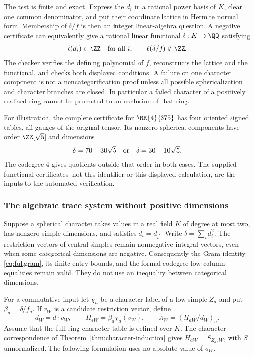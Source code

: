 The test is finite and exact. Express the $d_i$ in a rational power basis
of $K$, clear one common denominator, and put their coordinate lattice
in Hermite normal form. Membership of $\delta/f$ is then an integer
linear-algebra question. A negative certificate can equivalently give a
rational linear functional $\ell:K\to\QQ$ satisfying
\[
 \ell(d_i)\in\ZZ\quad\hbox{for all }i,
 \qquad \ell(\delta/f)\notin\ZZ.
\]
The checker verifies the defining polynomial of $f$, reconstructs the
lattice and the functional, and checks both displayed conditions. A
failure on one character component is not a noncategorification proof
unless all possible sphericalization and character branches are closed.
In particular a failed character of a positively realized ring cannot
be promoted to an exclusion of that ring.

For illustration, the complete certificate for $\RR{4}{375}$ has four
oriented signed tables, all gauges of the original tensor. Its nonzero
spherical components have order $\ZZ[\sqrt5]$ and dimensions
\[
 \delta=70+30\sqrt5\quad\hbox{or}\quad\delta=30-10\sqrt5.
\]
The codegree $4$ gives quotients outside that order in both cases.
The supplied functional certificates, not this identifier or this
displayed calculation, are the inputs to the automated verification.

\subsubsection{The algebraic trace system without positive dimensions}
Suppose a spherical character takes values in a real field $K$ of degree
at most two, has nonzero simple dimensions, and satisfies
$d_i=d_{i^*}$. Write $\delta=\sum_i d_i^2$. The restriction vectors of
central simples remain nonnegative integral vectors, even when some
categorical dimensions are negative. Consequently the Gram identity
\eqref{eq:fullgram}, its finite entry bounds, and the formal-codegree
low-column equalities remain valid. They do not use an inequality
between categorical dimensions.

For a commutative input let $\chi_a$ be a character label of a low simple
$Z_a$ and put $\beta_a=\delta/f_a$. If $v_W$ is a candidate restriction
vector, define
\[
 d_W=d\cdot v_W,\qquad
 H_{aW}=\beta_a\chi_a(v_W),\qquad
 \Lambda_W=(H_{aW}/d_W)_a.
\]
Assume that the full ring character table is defined over $K$. The
character correspondence of Theorem~\ref{thm:character-induction} gives
$H_{aW}=S_{Z_a,W}$, with $S$ unnormalized. The following formulation
uses no absolute value of $d_W$.

